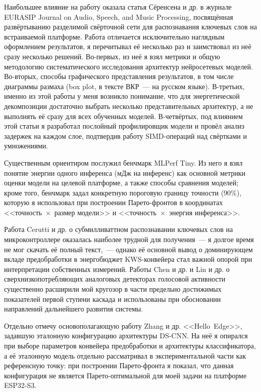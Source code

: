 Наибольшее влияние на работу оказала статья Сёренсена и
др. в журнале EURASIP Journal on Audio, Speech,
and Music Processing, посвящённая развёртыванию разделимой
свёрточной сети для распознавания ключевых слов на встраиваемой
платформе. Работа отличается исключительно наглядным
оформлением результатов, я перечитывал её несколько раз и
заимствовал из неё сразу несколько решений. Во-первых, из неё я
взял метрики и общую методологию систематического исследования
архитектур нейросетевых моделей. Во-вторых, способы графического
представления результатов, в том числе диаграммы размаха (box
plot, в тексте ВКР~--- на русском языке). В-третьих, именно из
этой работы у меня возникло понимание, что для энергетической
декомпозиции достаточно выбрать несколько представительных
архитектур, а не выполнять её сразу для всех обученных моделей.
В-четвёртых, под влиянием этой статьи я разработал послойный
профилировщик модели и провёл анализ задержек на каждом слое,
подтвердив работу SIMD-операций над свёртками и умножениями.

Существенным ориентиром послужил бенчмарк MLPerf Tiny.
Из него я взял понятие энергии одного инференса (мДж на инференс)
как основной метрики оценки модели на целевой платформе,
а также способы сравнения моделей; кроме того, бенчмарк задал
конкретную пороговую границу точности (90\%), которую я
использовал при построении Парето-фронтов в координатах
<<точность~$\times$~размер модели>> и
<<точность~$\times$~энергия инференса>>.

Работа Cerutti и др. о субмилливаттном
распознавании ключевых слов на микроконтроллере оказалась
наиболее трудной для получения~--- я долгое время не мог
скачать её полный текст,~--- однако её основной вывод о
доминирующем вкладе предобработки в энергобюджет KWS-конвейера
стал важной опорой при интерпретации собственных измерений.
Работы Chen и др. и Lin и др. о
сверхнизкопотребляющих аналоговых детекторах голосовой
активности существенно расширили мой кругозор в части предельно
достижимых показателей первой ступени каскада и использованы при
обосновании направлений дальнейшего развития системы.

Отдельно отмечу основополагающую работу Zhang и др.
<<Hello~Edge>>, задавшую эталонную конфигурацию
архитектуры DS-CNN. На неё я опирался при выборе параметров
конвейера предобработки и архитектуры классификатора, а её
эталонную модель отдельно рассматривал в экспериментальной части
как референсную точку: при построении Парето-фронта я показал,
что данная конфигурация не является Парето-оптимальной для моей
задачи на платформе ESP32-S3.

